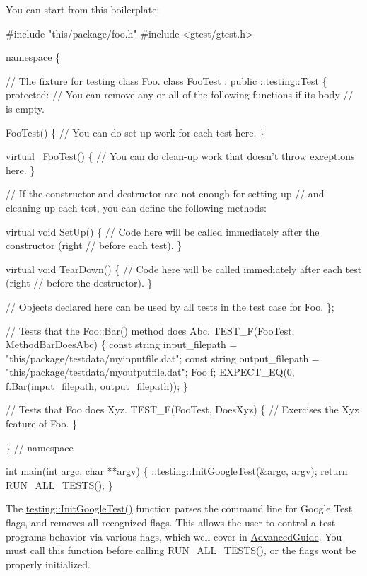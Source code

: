 You can start from this boilerplate\+: 
\begin{DoxyCode}
#include "this/package/foo.h"
#include <gtest/gtest.h>

namespace \{

// The fixture for testing class Foo.
class FooTest : public ::testing::Test \{
 protected:
  // You can remove any or all of the following functions if its body
  // is empty.

  FooTest() \{
    // You can do set-up work for each test here.
  \}

  virtual ~FooTest() \{
    // You can do clean-up work that doesn't throw exceptions here.
  \}

  // If the constructor and destructor are not enough for setting up
  // and cleaning up each test, you can define the following methods:

  virtual void SetUp() \{
    // Code here will be called immediately after the constructor (right
    // before each test).
  \}

  virtual void TearDown() \{
    // Code here will be called immediately after each test (right
    // before the destructor).
  \}

  // Objects declared here can be used by all tests in the test case for Foo.
\};

// Tests that the Foo::Bar() method does Abc.
TEST\_F(FooTest, MethodBarDoesAbc) \{
  const string input\_filepath = "this/package/testdata/myinputfile.dat";
  const string output\_filepath = "this/package/testdata/myoutputfile.dat";
  Foo f;
  EXPECT\_EQ(0, f.Bar(input\_filepath, output\_filepath));
\}

// Tests that Foo does Xyz.
TEST\_F(FooTest, DoesXyz) \{
  // Exercises the Xyz feature of Foo.
\}

\}  // namespace

int main(int argc, char **argv) \{
  ::testing::InitGoogleTest(&argc, argv);
  return RUN\_ALL\_TESTS();
\}
\end{DoxyCode}


The {\ttfamily \hyperlink{namespacetesting_afd726ae08c9bd16dc52f78c822d9946b}{testing\+::\+Init\+Google\+Test()}} function parses the command line for Google Test flags, and removes all recognized flags. This allows the user to control a test program\textquotesingle{}s behavior via various flags, which we\textquotesingle{}ll cover in \hyperlink{V1__5__AdvancedGuide_8md}{Advanced\+Guide}. You must call this function before calling {\ttfamily \hyperlink{gtest_8h_a853a3792807489591d3d4a2f2ff9359f}{R\+U\+N\+\_\+\+A\+L\+L\+\_\+\+T\+E\+S\+T\+S()}}, or the flags won\textquotesingle{}t be properly initialized.

